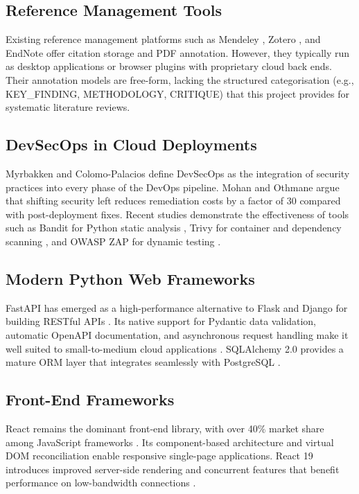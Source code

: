 \documentclass[conference]{IEEEtran}
\begin{document}
\subsection{Reference Management Tools}
Existing reference management platforms such as Mendeley \cite{ivey2018mendeley}, Zotero \cite{vanhecke2008zotero}, and EndNote \cite{bramer2018endnote} offer citation storage and PDF annotation. However, they typically run as desktop applications or browser plugins with proprietary cloud back ends. Their annotation models are free-form, lacking the structured categorisation (e.g., KEY\_FINDING, METHODOLOGY, CRITIQUE) that this project provides for systematic literature reviews.

\subsection{DevSecOps in Cloud Deployments}
Myrbakken and Colomo-Palacios \cite{myrbakken2017devsecops} define DevSecOps as the integration of security practices into every phase of the DevOps pipeline. Mohan and Othmane \cite{mohan2016secdevops} argue that shifting security left reduces remediation costs by a factor of 30 compared with post-deployment fixes. Recent studies demonstrate the effectiveness of tools such as Bandit for Python static analysis \cite{bandit2023docs}, Trivy for container and dependency scanning \cite{trivy2023aqua}, and OWASP ZAP for dynamic testing \cite{owaspzap2023}.

\subsection{Modern Python Web Frameworks}
FastAPI has emerged as a high-performance alternative to Flask and Django for building RESTful APIs \cite{fastapi2023docs}. Its native support for Pydantic data validation, automatic OpenAPI documentation, and asynchronous request handling make it well suited to small-to-medium cloud applications \cite{ramirez2023fastapi}. SQLAlchemy 2.0 provides a mature ORM layer that integrates seamlessly with PostgreSQL \cite{sqlalchemy2023docs}.

\subsection{Front-End Frameworks}
React remains the dominant front-end library, with over 40\% market share among JavaScript frameworks \cite{stackoverflow2023survey}. Its component-based architecture and virtual DOM reconciliation enable responsive single-page applications. React 19 introduces improved server-side rendering and concurrent features that benefit performance on low-bandwidth connections \cite{react2024docs}.
\end{document}
